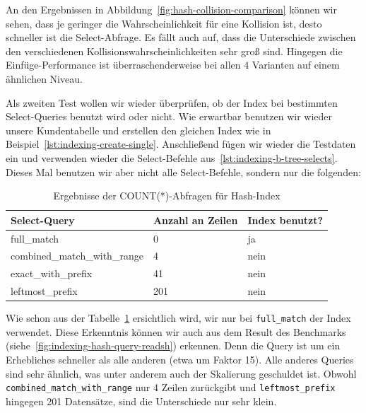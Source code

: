 An den Ergebnissen in Abbildung~\ref{fig:hash-collision-comparison} können wir sehen, dass je geringer die Wahrscheinlichkeit für eine Kollision ist, desto schneller ist die Select-Abfrage.
Es fällt auch auf, dass die Unterschiede zwischen den verschiedenen Kollisionswahrscheinlichkeiten sehr groß sind.
Hingegen die Einfüge-Performance ist überraschenderweise bei allen 4 Varianten auf einem ähnlichen Niveau.

Als zweiten Test wollen wir wieder überprüfen, ob der Index bei bestimmten Select-Queries benutzt wird oder nicht.
Wie erwartbar benutzen wir wieder unsere Kundentabelle und erstellen den gleichen Index wie in Beispiel~\ref{lst:indexing-create-single}.
Anschließend fügen wir wieder die Testdaten ein und verwenden wieder die Select-Befehle aus~\ref{lst:indexing-b-tree-selects}.
Dieses Mal benutzen wir aber nicht alle Select-Befehle, sondern nur die folgenden:

\begin{table}[H]
    \centering
    \begin{tabular}{|l|l|l|}
        \hline
        \textbf{Select-Query} & \textbf{Anzahl an Zeilen} & \textbf{Index benutzt?} \\
        \hline
        full\_match & 0 & ja \\
        combined\_match\_with\_range & 4 & nein \\
        exact\_with\_prefix & 41 & nein \\
        leftmost\_prefix & 201 & nein \\
        \hline
    \end{tabular}
    \caption{Ergebnisse der COUNT(*)-Abfragen für Hash-Index}
    \label{tab:indexing_hash_count_results}
\end{table}
\vspace{-15pt}

Wie schon aus der Tabelle~\ref{tab:indexing_hash_count_results} ersichtlich wird, wir nur bei \texttt{full\_match} der Index verwendet.
Diese Erkenntnis können wir auch aus dem Result des Benchmarks (siehe~\ref{fig:indexing-hash-query-readsh}) erkennen.
Denn die Query ist um ein Erhebliches schneller als alle anderen (etwa um Faktor 15).
Alle anderes Queries sind sehr ähnlich, was unter anderem auch der Skalierung geschuldet ist.
Obwohl \texttt{combined\_match\_with\_range} nur 4 Zeilen zurückgibt und \texttt{leftmost\_prefix} hingegen 201 Datensätze, sind die Unterschiede nur sehr klein.

